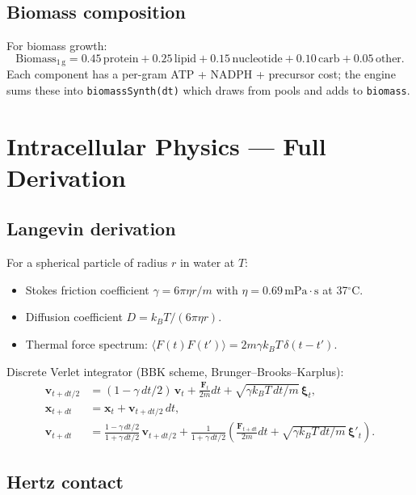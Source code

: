 \documentclass[11pt,letterpaper,twoside,openany]{book}
\newcommand{\code}[1]{\texttt{#1}}
\begin{document}
\section{Biomass composition}

For biomass growth:
\[
\text{Biomass}_{1\,\text{g}} = 0.45\,\text{protein} + 0.25\,\text{lipid} + 0.15\,\text{nucleotide} + 0.10\,\text{carb} + 0.05\,\text{other}.
\]
Each component has a per-gram ATP + NADPH + precursor cost; the
engine sums these into \code{biomassSynth(dt)} which draws from
pools and adds to \code{biomass}.

\chapter{Intracellular Physics --- Full Derivation}
\label{ch:intraphysics-deep}

\section{Langevin derivation}

For a spherical particle of radius $r$ in water at $T$:
\begin{itemize}
  \item Stokes friction coefficient $\gamma = 6\pi\eta r / m$ with
        $\eta = 0.69\,\text{mPa}\cdot\text{s}$ at 37$^\circ$C.
  \item Diffusion coefficient $D = k_B T / (6\pi\eta r)$.
  \item Thermal force spectrum: $\langle F(t)F(t')\rangle =
        2 m\gamma k_B T\,\delta(t-t')$.
\end{itemize}

Discrete Verlet integrator (BBK scheme, Brunger--Brooks--Karplus):
\begin{align}
  \mathbf{v}_{t+dt/2} &= (1 - \gamma\,dt/2)\,\mathbf{v}_t + \frac{\mathbf{F}_t}{2m}dt + \sqrt{\gamma k_B T\,dt / m}\,\boldsymbol{\xi}_t,\\
  \mathbf{x}_{t+dt} &= \mathbf{x}_t + \mathbf{v}_{t+dt/2}\,dt,\\
  \mathbf{v}_{t+dt} &= \frac{1 - \gamma\,dt/2}{1 + \gamma\,dt/2}\,\mathbf{v}_{t+dt/2} + \frac{1}{1 + \gamma\,dt/2}\left(\frac{\mathbf{F}_{t+dt}}{2m}dt + \sqrt{\gamma k_B T\,dt / m}\,\boldsymbol{\xi}'_t\right).
\end{align}

\section{Hertz contact}
\end{document}
